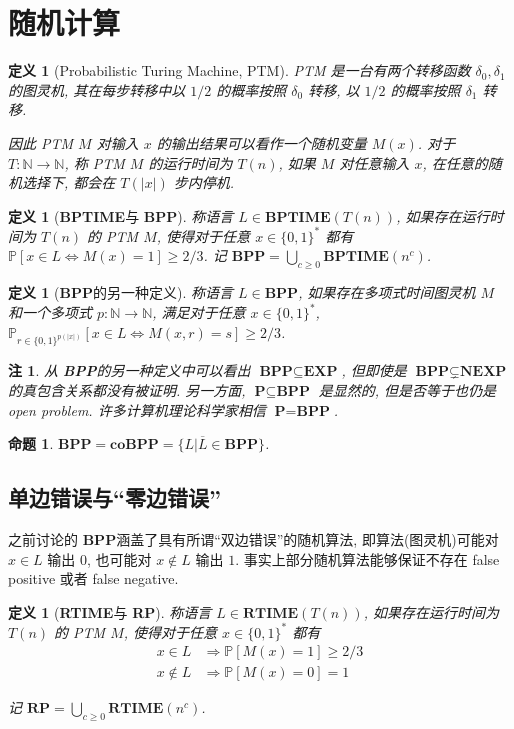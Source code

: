 \documentclass[8pt]{article}
\theoremstyle{compact}
\newtheorem{definition}[theorem]{定义}
\newtheorem{proposition}[theorem]{命题}
\newtheorem{remark}[theorem]{注}
\def\ge{\geqslant}
\def\P{\textbf{P}}
\def\EXP{\textbf{EXP}}
\def\NEXP{\textbf{NEXP}}
\def\BPTIME{\textbf{BPTIME}}
\def\BPP{\textbf{BPP}}
\def\coBPP{\textbf{coBPP}}
\def\RTIME{\textbf{RTIME}}
\def\RP{\textbf{RP}}
\begin{document}
\section{随机计算}
\begin{definition}[Probabilistic Turing Machine, PTM]
	PTM 是一台有两个转移函数 $\delta_0, \delta_1$ 的图灵机, 其在每步转移中以 $1/2$ 的概率按照 $\delta_0$ 转移, 以 $1/2$ 的概率按照 $\delta_1$ 转移.
	
	因此 PTM $M$ 对输入 $x$ 的输出结果可以看作一个随机变量 $M(x)$. 对于 $T: \mathbb N \to \mathbb N$, 称 PTM $M$ 的运行时间为 $T(n)$, 如果 $M$ 对任意输入 $x$, 在任意的随机选择下, 都会在 $T(|x|)$ 步内停机.
\end{definition}
\begin{definition}[\BPTIME 与 \BPP]
	称语言 $L \in \BPTIME(T(n))$, 如果存在运行时间为 $T(n)$ 的 PTM $M$, 使得对于任意 $x \in \{0, 1\}^*$ 都有 $\mathbb P[x \in L \Leftrightarrow M(x) = 1] \ge 2/3$. 记 $\BPP = \bigcup_{c \ge 0}\BPTIME(n^c)$.
\end{definition}
\begin{definition}[\BPP 的另一种定义]
	称语言 $L \in \BPP$, 如果存在多项式时间图灵机 $M$ 和一个多项式 $p: \mathbb N \to \mathbb N$, 满足对于任意 $x \in \{0, 1\}^*$, $\mathbb P_{r \in \{0, 1\}^{p(|x|)}}[x \in L \Leftrightarrow M(x, r) = s] \ge 2/3$.
\end{definition}
\begin{remark}
	从 \BPP 的另一种定义中可以看出 $\BPP \subseteq \EXP$, 但即使是 $\BPP \subsetneq \NEXP$ 的真包含关系都没有被证明. 另一方面, $\P \subseteq \BPP$ 是显然的, 但是否等于也仍是 open problem. 许多计算机理论科学家相信 $\P = \BPP$.
\end{remark}
\begin{proposition}
	$\BPP = \coBPP = \{L | \overline{L} \in \BPP\}$.
\end{proposition}
\subsection{单边错误与“零边错误”}
之前讨论的 \BPP 涵盖了具有所谓“双边错误”的随机算法, 即算法(图灵机)可能对 $x \in L$ 输出 $0$, 也可能对 $x \notin L$ 输出 $1$. 事实上部分随机算法能够保证不存在 false positive 或者 false negative.
\begin{definition}[\RTIME 与 \RP]
	称语言 $L \in \RTIME(T(n))$, 如果存在运行时间为 $T(n)$ 的 PTM $M$, 使得对于任意 $x \in \{0, 1\}^*$ 都有 \begin{equation*}
		\begin{split}
			x \in L &\Rightarrow \mathbb P[M(x) = 1] \ge 2/3 \\
			x \notin L &\Rightarrow \mathbb P[M(x) = 0] = 1
		\end{split}
	\end{equation*}
	
	记 $\RP = \bigcup_{c \ge 0} \RTIME(n^c)$.
\end{definition}
\end{document}
